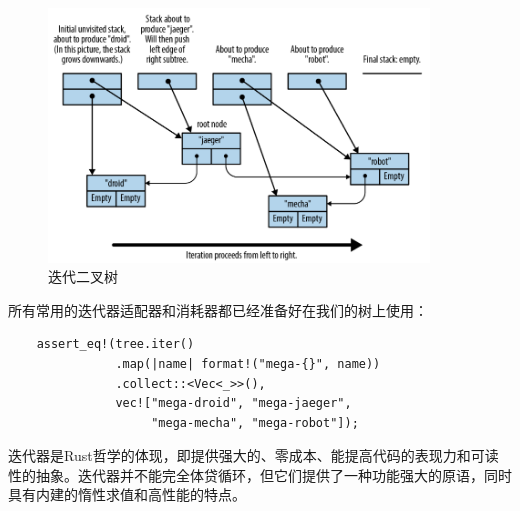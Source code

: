 \begin{figure}[htbp]
    \centering
    \includegraphics[width=0.9\textwidth]{../img/f15-1.png}
    \caption{迭代二叉树}
    \label{f15-1}
\end{figure}

所有常用的迭代器适配器和消耗器都已经准备好在我们的树上使用：
\begin{verbatim}
    assert_eq!(tree.iter()
               .map(|name| format!("mega-{}", name))
               .collect::<Vec<_>>(),
               vec!["mega-droid", "mega-jaeger",
                    "mega-mecha", "mega-robot"]);
\end{verbatim}

迭代器是Rust哲学的体现，即提供强大的、零成本、能提高代码的表现力和可读性的抽象。迭代器并不能完全体贷循环，但它们提供了一种功能强大的原语，同时具有内建的惰性求值和高性能的特点。
